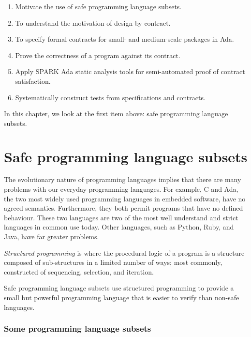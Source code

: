 \begin{enumerate}

 \item Motivate the use of safe programming language subsets.

 \item To understand the motivation of design by contract.

 \item To specify formal contracts for small- and medium-scale packages in Ada.

 \item Prove the correctness of a program against its contract.

 \item Apply SPARK Ada static analysis tools for semi-automated proof of contract satisfaction.

 \item Systematically construct tests from specifications and contracts.

\end{enumerate}

In this chapter, we look at the first item above: safe programming language subsets.

\section{Safe programming language subsets}

The evolutionary nature of programming languages implies that there are many problems with our everyday programming languages. For example, C and Ada, the two most widely used programming languages in embedded software, have no agreed semantics. Furthermore, they both permit programs that have no defined behaviour. These two languages are two of the most well understand and strict languages in common use today. Other languages, such as Python, Ruby, and Java, have far greater problems.

{\em Structured programming} is where the procedural logic of a program is a structure composed of sub-structures in a limited number of ways; most commonly, constructed of sequencing, selection, and iteration.

Safe programming language subsets use structured programming to provide a small but powerful programming language that is easier to verify than non-safe languages.

\subsubsection*{Some programming language subsets}

